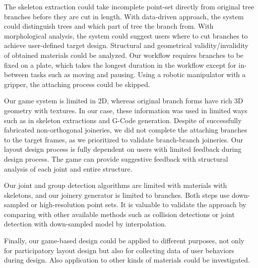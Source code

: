 The skeleton extraction could take incomplete point-set directly from original tree branches before they are cut in length.
With data-driven approach, the system could distinguish trees and which part of tree the branch from.
With morphological analysis, the system could suggest users where to cut branches to achieve user-defined target design.
Structural and geometrical validity/invalidity of obtained materials could be analyzed.
Our workflow requires branches to be fixed on a plate, which takes the longest duration in the workflow except for in-between tasks such as moving and pausing.
Using a robotic manipulator with a gripper, the attaching process could be skipped.

Our game system is limited in 2D, whereas original branch forms have rich 3D geometry with textures.
In our case, these information was used in limited ways such as in skeleton extractions and G-Code generation.
Despite of successfully fabricated non-orthogonal joineries, we did not complete the attaching branches to the target frames, as we prioritized to validate branch-branch joineries.
Our layout design process is fully dependent on users with limited feedback during design process.
The game can provide suggestive feedback with structural analysis of each joint and entire structure.

Our joint and group detection algorithms are limited with materials with skeletons, and our joinery generator is limited to branches.
Both steps use down-sampled or high-resolution point sets.
It is valuable to validate the approach by comparing with other available methods such as collision detections or joint detection with down-sampled model by interpolation.

Finally, our game-based design could be applied to different purposes, not only for participatory layout design but also for collecting data of user behaviors during design.
Also application to other kinds of materials could be investigated.

